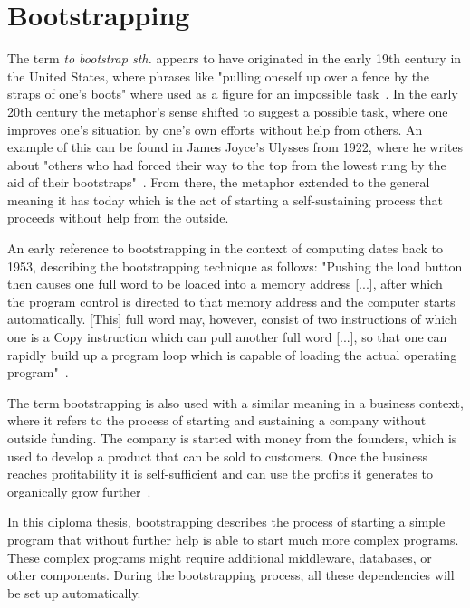 \section{Bootstrapping}
\label{fundamentals:bootstrapping}

The term \textit{to bootstrap sth.} appears to have originated in the early 19th century in the United States, where phrases like "pulling oneself up over a fence by the straps of one's boots" where used as a figure for an impossible task~\autocite{bootstrap:history}.
In the early 20th century the metaphor's sense shifted to suggest a possible task, where one improves one's situation by one's own efforts without help from others.
An example of this can be found in James Joyce's Ulysses from 1922, where he writes about "others who had forced their way to the top from the lowest rung by the aid of their bootstraps"~\autocite{bootstrap:ulysses}.
From there, the metaphor extended to the general meaning it has today which is the act of starting a self-sustaining process that proceeds without help from the outside.

An early reference to bootstrapping in the context of computing dates back to 1953, describing the bootstrapping technique as follows: "Pushing the load button then causes one full word to be loaded into a memory address [...], after which the program control is directed to that memory address and the computer starts automatically. [This] full word may, however, consist of two instructions of which one is a Copy instruction which can pull another full word [...], so that one can rapidly build up a program loop which is capable of loading the actual operating program"~\autocite{bootstrap:early}.

The term bootstrapping is also used with a similar meaning in a business context, where it refers to the process of starting and sustaining a company without outside funding.
The company is started with money from the founders, which is used to develop a product that can be sold to customers.
Once the business reaches profitability it is self-sufficient and can use the profits it generates to organically grow further~\autocite{bootstrap:business}.

In this diploma thesis, bootstrapping describes the process of starting a simple program that without further help is able to start much more complex programs.
These complex programs might require additional middleware, databases, or other components.
During the bootstrapping process, all these dependencies will be set up automatically.
